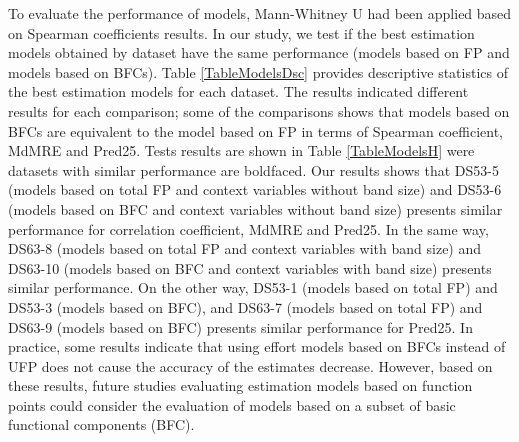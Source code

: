 \documentclass[conference]{IEEEtran}
\begin{document}
To evaluate the performance of models, Mann-Whitney U had been applied based on Spearman coefficients results. In our study, we test if the best estimation models obtained by dataset have the same performance (models based on FP and models based on BFCs). Table \ref{TableModelsDsc} provides descriptive statistics of the best estimation models for each dataset. The results indicated different results for each comparison; some of the comparisons shows that models based on BFCs are equivalent to the model based on FP in terms of Spearman coefficient, MdMRE and Pred25. Tests results are shown in Table \ref{TableModelsH} were datasets with similar performance are boldfaced. Our results shows that DS53-5 (models based on total FP and context variables without band size) and DS53-6 (models based on BFC and context variables without band size) presents similar performance for correlation coefficient, MdMRE and Pred25. In the same way, DS63-8 (models based on total FP and context variables with band size) and DS63-10 (models based on BFC and context variables with band size) presents similar performance. On the other way, DS53-1 (models based on total FP) and DS53-3 (models based on BFC), and DS63-7 (models based on total FP) and DS63-9 (models based on BFC) presents similar performance for Pred25. In practice, some results indicate that using effort models based on BFCs instead of UFP does not cause the accuracy of the estimates decrease. However, based on these results, future studies evaluating estimation models based on function points could consider the evaluation of models based on a subset of basic functional components (BFC).
\end{document}
